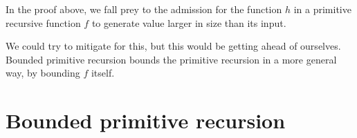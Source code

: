 In the proof above, we fall prey to the admission for the function $h$ in a
primitive recursive function $f$ to generate value larger in size than its
input.

We could try to mitigate for this, but this would be getting ahead of
ourselves. Bounded primitive recursion bounds the primitive recursion in a more
general way, by bounding $f$ itself.

\section{Bounded primitive recursion}

